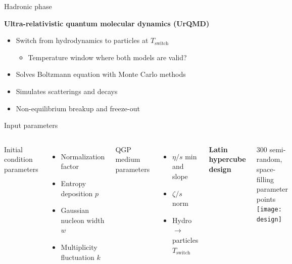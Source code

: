 \documentclass{beamer}
\begin{document}
\begin{frame}[t]{Hadronic phase}
  \begin{center}
    \textbf{Ultra-relativistic quantum molecular dynamics (UrQMD)}
  \end{center}
  \begin{itemize}
    \item Switch from hydrodynamics to particles at $T_\text{switch}$
      \begin{itemize}
        \item Temperature window where both models are valid?
      \end{itemize}
    \item Solves Boltzmann equation with Monte Carlo methods
    \item Simulates scatterings and decays
    \item Non-equilibrium breakup and freeze-out
  \end{itemize}
\end{frame}


\begin{frame}{Input parameters}
  \begin{columns}
    Initial condition parameters
    \begin{itemize}
      \item Normalization factor
      \item Entropy deposition $p$
      \item Gaussian nucleon width $w$
      \item Multiplicity fluctuation $k$
    \end{itemize}
    \medskip
    QGP medium parameters
    \begin{itemize}
      \item $\eta/s$ min and slope
      \item $\zeta/s$ norm
      \item Hydro $\rightarrow$ particles $T_\text{switch}$
    \end{itemize}
    \begin{center}
      \textbf{Latin hypercube design}
    \end{center}
    300 semi-random, space-filling parameter points \\[1em]
    \texttt{[image: design]}
  \end{columns}
\end{frame}
\end{document}

